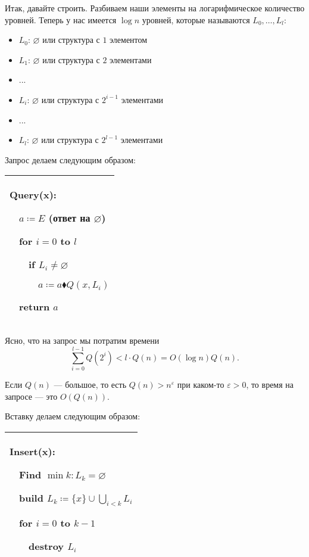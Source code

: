 Итак, давайте строить. Разбиваем наши элементы на логарифмическое количество уровней. Теперь у нас имеется $\log n $ уровней, которые называются $L_0,\ldots,L_l$: \begin{itemize}
    \item $L_0$: $\varnothing$ или структура с $1$ элементом

    \item $L_1$: $\varnothing$ или структура с $2$ элементами

    \item ...

    \item $L_i$: $\varnothing$ или структура с $2^{i-1}$ элементами

    \item ...

    \item $L_l$: $\varnothing$ или структура с $2^{l-1}$ элементами

\end{itemize}

Запрос делаем следующим образом:

\begin{tabular}{|p{4cm}|}
\hline
Query(x):

$\quad$$a \coloneqq E$ (ответ на $\varnothing$)

$\quad$for $i=0$ to $l$

$\quad$$\quad$if $L_i \ne \varnothing$

$\quad$$\quad$$\quad$$a \coloneqq a\blacklozenge Q(x,L_i)$

$\quad$return $a$\\
\hline
\end{tabular}


Ясно, что на запрос мы потратим времени $$\sum_{i=0}^{l-1}Q(2^i)<l\cdot Q(n)=O(\log n)Q(n).$$

\begin{remark}
Если $Q(n)$ — большое, то есть $Q(n)>n^\varepsilon$ при каком-то $\varepsilon >0$, то время на запросе — это $O(Q(n))$.
\end{remark} 

Вставку делаем следующим образом:

\begin{tabular}{|p{5cm}|}
\hline
Insert(x):

$\quad$Find $\min k: L_k=\varnothing$

$\quad$build $L_k \coloneqq \{x\}\cup \bigcup_{i<k} L_i$

$\quad$for $i=0$ to $k-1$ 

$\quad$$\quad$destroy $L_i$\\

\hline
\end{tabular}

